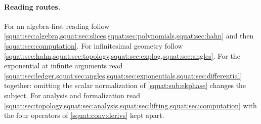 \documentclass[11pt,letterpaper]{article}
\numberwithin{equation}{section}
\theoremstyle{definition}
\theoremstyle{remark}
\begin{document}
\paragraph{Reading routes.} For an algebra-first reading follow
\cref{squat:sec:algebra,squat:sec:slices,squat:sec:polynomials,squat:sec:hahn} and then
\cref{squat:sec:computation}. For infinitesimal geometry follow
\cref{squat:sec:hahn,squat:sec:topology,squat:sec:explog,squat:sec:angles}. For the
exponential at infinite arguments read
\cref{squat:sec:ledger,squat:sec:angles,squat:sec:exponentials,squat:sec:differential}
together: omitting the scalar normalization of \cref{squat:sub:ekphase} changes the
subject. For analysis and formalization read
\cref{squat:sec:topology,squat:sec:analysis,squat:sec:lifting,squat:sec:computation} with
the four operators of \cref{squat:conv:derivs} kept apart.
\end{document}
